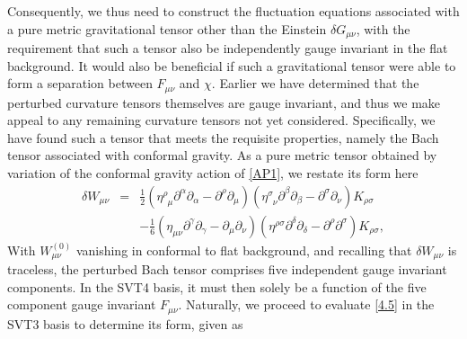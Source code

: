 Consequently, we thus need to construct the fluctuation equations associated with a pure metric gravitational tensor other than the Einstein $\delta G_{\mu\nu}$, with the requirement that such a tensor also be independently gauge invariant in the flat background. It would also be beneficial if such a gravitational tensor were able to form a separation between $F_{\mu\nu}$ and $\chi$. Earlier we have determined that the perturbed curvature tensors themselves are gauge invariant, and thus we make appeal to any remaining curvature tensors not yet considered. Specifically, we have found such a tensor that meets the requisite properties, namely the Bach tensor associated with conformal gravity. As a pure metric tensor obtained by variation of the conformal gravity action of \eqref{AP1}, we restate its form here \cite{mannheim_2006}
%
\begin{eqnarray}
\delta W_{\mu\nu}&=&\frac{1}{2}(\eta^{\rho}_{\phantom{\rho} \mu} \partial^{\alpha}\partial_{\alpha}-\partial^{\rho}\partial_{\mu})
(\eta^{\sigma}_{\phantom{\sigma} \nu} \partial^{\beta}\partial_{\beta}-
\partial^{\sigma}\partial_{\nu})K_{\rho \sigma}
\nonumber\\
&&- \frac{1}{6}(\eta_{\mu \nu} \partial^{\gamma}\partial_{\gamma}-
\partial_{\mu}\partial_{\nu})(\eta^{\rho \sigma} \partial^{\delta}\partial_{\delta}-
\partial^{\rho}\partial^{\sigma})K_{\rho\sigma},
\label{4.5}
\end{eqnarray}
%
With $W_{\mu\nu}^{(0)}$ vanishing in conformal to flat background, and recalling that $\delta W_{\mu\nu}$ is traceless, the perturbed Bach tensor comprises five independent gauge invariant components. In the SVT4 basis, it must then solely be a function of the five component gauge invariant $F_{\mu\nu}$. Naturally, we proceed to evaluate \eqref{4.5} in the SVT3 basis to determine its form, given as
%
